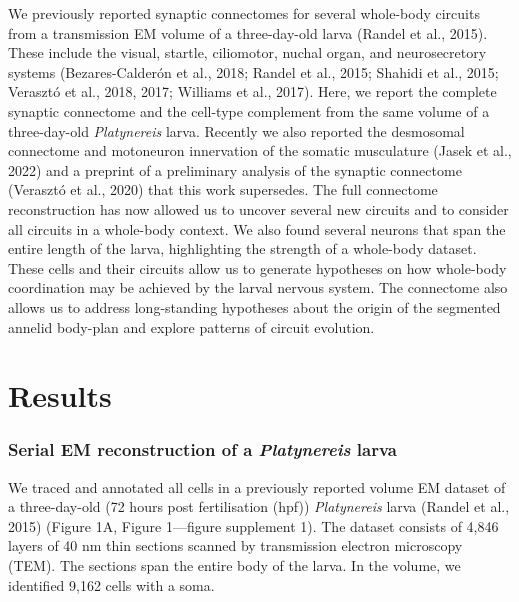 \documentclass[
  11pt,
]{article}
\begin{document}
We previously reported synaptic connectomes for several whole-body
circuits from a transmission EM volume of a three-day-old larva (Randel
et al., 2015). These include the visual, startle, ciliomotor, nuchal
organ, and neurosecretory systems (Bezares-Calderón et al., 2018; Randel
et al., 2015; Shahidi et al., 2015; Verasztó et al., 2018, 2017;
Williams et al., 2017). Here, we report the complete synaptic connectome
and the cell-type complement from the same volume of a three-day-old
\emph{Platynereis} larva. Recently we also reported the desmosomal
connectome and motoneuron innervation of the somatic musculature (Jasek
et al., 2022) and a preprint of a preliminary analysis of the synaptic
connectome (Verasztó et al., 2020) that this work supersedes. The full
connectome reconstruction has now allowed us to uncover several new
circuits and to consider all circuits in a whole-body context. We also
found several neurons that span the entire length of the larva,
highlighting the strength of a whole-body dataset. These cells and their
circuits allow us to generate hypotheses on how whole-body coordination
may be achieved by the larval nervous system. The connectome also allows
us to address long-standing hypotheses about the origin of the segmented
annelid body-plan and explore patterns of circuit evolution.

\section{Results}\label{results}

\subsubsection{\texorpdfstring{Serial EM reconstruction of a
\emph{Platynereis}
larva}{Serial EM reconstruction of a Platynereis larva}}\label{serial-em-reconstruction-of-a-platynereis-larva}

We traced and annotated all cells in a previously reported volume EM
dataset of a three-day-old (72 hours post fertilisation (hpf))
\emph{Platynereis} larva (Randel et al., 2015) (Figure 1A, Figure
1---figure supplement 1). The dataset consists of 4,846 layers of 40 nm
thin sections scanned by transmission electron microscopy (TEM). The
sections span the entire body of the larva. In the volume, we identified
9,162 cells with a soma.
\end{document}
